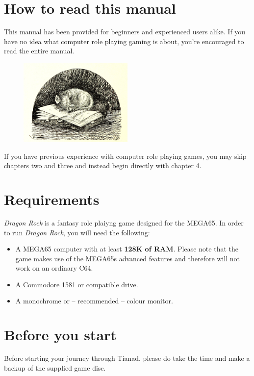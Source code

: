 \documentclass[12pt]{scrbook}
\begin{document}
\section*{How to read this manual}

This manual has been provided for beginners and experienced users alike. If you have no idea what computer role playing gaming is about, you're encouraged to read the entire manual. 

\begin{figure}[ht]
    \centering
    \includegraphics[width=0.5\textwidth]{illustrations/dormouse.jpg}
\end{figure}

If you have previous experience with computer role playing games, you may skip chapters two and three and instead begin directly with chapter 4. 


\section*{Requirements}
\textit{Dragon Rock} is a fantasy role plaiyng game designed for the MEGA65. In order to run \textit{Dragon Rock}, you will need the following:
\begin{itemize}
    \item A MEGA65 computer with at least \textbf{128K of RAM}. Please note that the game makes use of the MEGA65s advanced features and therefore will not work on an ordinary C64.
    \item A Commodore 1581 or compatible drive.
    \item A monochrome or -- recommended -- colour monitor.
\end{itemize}

\section*{Before you start}
Before starting your journey through Tianad, please do take the time and make a backup of the supplied game disc.
\end{document}
